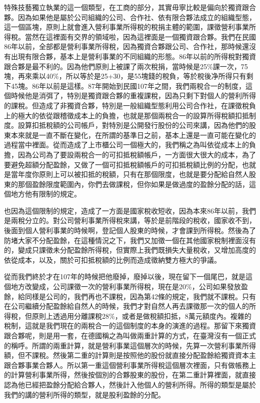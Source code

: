\documentclass[oneside,sub3section]{ctexbook}
\begin{document}
特殊技藝獨立執業的這一個類型，在工商的部分，其實毋寧比較是偏向於獨資跟合夥。因為如果他是屬於公司組織的公司、合作社、依有限合夥法成立的組織型態，這一個區塊，原則上就會進入營利事業所得稅的稅捐主體的範圍，課徵營利事業所得稅。當然在這裡面有交界的領域啦，因為這裡面是一個獨資跟合夥。我們在民國86年以前，全部都是營利事業所得稅，因為獨資合夥跟公司、合作社，那時候還沒有出現有限合夥，基本上是營利事業的不同組織的形態。86年以前的所得稅對獨資跟合夥是最不利的。因為他們原則上被課了兩次稅捐，當時候是25\%課一次，75塊，再來乘以40\%，所以等於是25+30，是55塊錢的稅負，等於稅後净所得只有剩下45塊。86年以前是這樣。87年開始到民國107年之間，我們兩稅合一的制度，這個時候他是消弭了，特別是獨資跟合夥的重複課稅，因為只剩下對個人的營利所得的課稅。但造成了非獨資合夥，特別是一般組織型態利用公司合作社，在課徵稅負上的極大的依從跟稽徵成本上的負擔，也就是那個兩稅合一的設算所得稅額扣抵制度。設算扣抵稅額的公司帳戶，對特別是公開發行股份的公司來講，因為他們的股東本來就是一直不斷在變化，在所謂的基準日之前，基本上還是一直可能在變化的過程當中裡面。從而造成了上市櫃公司一個極大的，我們稱之為叫依從成本上的負擔，因為公司為了要設兩稅合一的可扣抵稅額帳戶，一方面很大很大的成本，為了要避免超額分配盈餘，又做了一個可扣抵稅額帳戶的可扣抵稅額比例的分配，也就是當年度你原則上可以被扣抵的稅額，只有在那個限度，也就是要分配給自然人股東的那個盈餘限度範圍內，你們去做課稅，但你如果是做過度的盈餘分配的話，這個地方他有限制的規定。

也因為這個限制的規定，造成了一方面是國家稅收短收，因為本來86年以前，我們是兩稅分立的。對公司營利事業所得稅來講，等於是前階段的稅收，國家收不到，後面到個人營利事業的時候啊，登記個人股東的時候，才會課到所得稅。然後為了防堵大家不分配盈餘，在這種情況之下，我們又加徵一個在其他國家稅制裡面沒有的，變成只課徵未分配盈餘所得稅，但實際上我們既損失大量稅收，又增加高度的依從成本，以及，關於可扣抵稅額的比例而造成徵納雙方極大的爭議。

從而我們終於才在107年的時候把他廢掉，廢掉以後，現在留下一個尾巴，就是這個地方改變成，公司課徵一次的營利事業所得稅，現在是20\%，公司如果發放盈餘，給同樣是公司的，我們再也不課稅，因為第42條的規定，我們就不課稅。只有在公司繼續分配盈餘給自然人的時候，我們才對自然人再去課徵那一次的個人的所得稅，但原則上透過用分離課稅28\%，或者是做稅額扣抵，8萬元額度內。複雜的稅制，這就是我們現在的兩稅合一的這個制度的本身的演進的過程。那留下來獨資跟合夥呢，則是用一套，在德國稱之為叫做兩重計算的方式，在臺灣沒有一個正式的稱呼。所謂的兩重計算，就是營利事業這個層次的時候，先算一次營利事業所得額，但不課稅。然後第二重的計算則是按照他的股份就直接分配盈餘給獨資資本主跟合夥事業合夥人。所以第一重這個營利事業所得稅這個層次裡面，只有做帳務上的計算營利事業所得，然後按個別的合夥股東的股份，在第二重計算裡面，就直接認為他已經把盈餘分配給合夥人，然後計入他個人的營利所得。所得的類型是屬於我們的講的營利所得的類型，就是股利盈餘的分配。
\end{document}
